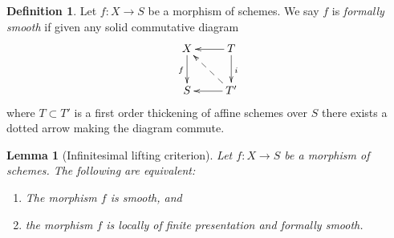 \documentclass{amsart}
\theoremstyle{plain}
\newtheorem{lemma}[subsection]{Lemma}
\theoremstyle{definition}
\newtheorem{definition}[subsection]{Definition}
\theoremstyle{remark}
\numberwithin{equation}{subsection}
\begin{document}
\begin{definition}
\label{definition-formally-smooth}
Let $f : X \to S$ be a morphism of schemes.
We say $f$ is {\it formally smooth} if given any solid commutative diagram
$$
\xymatrix{
X \ar[d]_f & T \ar[d]^i \ar[l] \\
S & T' \ar[l] \ar@{-->}[lu]
}
$$
where $T \subset T'$ is a first order thickening of affine schemes over $S$
there exists a dotted arrow making the diagram commute.
\end{definition}

\begin{lemma}[Infinitesimal lifting criterion]
\label{lemma-smooth-formally-smooth}
Let $f : X \to S$ be a morphism of schemes.
The following are equivalent:
\begin{enumerate}
\item The morphism $f$ is smooth, and
\item the morphism $f$ is locally of finite presentation and
formally smooth.
\end{enumerate}
\end{lemma}
\end{document}
